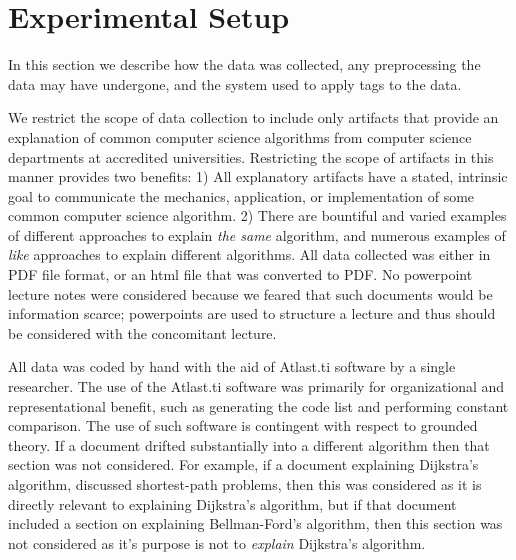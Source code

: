\documentclass[sigconf]{acmart}
\begin{document}

\section{Experimental Setup}
\label{sec:exp:data}
In this section we describe how the data was collected, any preprocessing the
data may have undergone, and the system used to apply tags to the data. 

We restrict the scope of data collection to include only artifacts that provide
an explanation of common computer science algorithms from computer science
departments at accredited universities. Restricting the scope of artifacts in
this manner provides two benefits: 1) All explanatory artifacts have a stated,
intrinsic goal to communicate the mechanics, application, or implementation of
some common computer science algorithm. 2) There are bountiful and varied
examples of different approaches to explain \emph{the same} algorithm, and
numerous examples of \emph{like} approaches to explain different algorithms. All
data collected was either in PDF file format, or an html file that was converted
to PDF. No powerpoint lecture notes were considered because we feared that such
documents would be information scarce; powerpoints are used to structure a
lecture and thus should be considered with the concomitant lecture.

All data was coded by hand with the aid of Atlast.ti software  by a single researcher. The use of the Atlast.ti software
was primarily for organizational and representational benefit, such as
generating the code list and performing constant comparison.
%
The use of such software is contingent with respect to grounded theory.
%
If a document drifted substantially into a different algorithm then that section
was not considered. For example, if a document explaining Dijkstra's algorithm,
discussed shortest-path problems, then this was considered as it is directly
relevant to explaining Dijkstra's algorithm, but if that document included a
section on explaining Bellman-Ford's algorithm, then this section was not
considered as it's purpose is not to \emph{explain} Dijkstra's algorithm.
\end{document}
